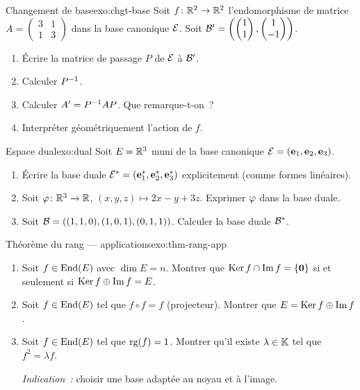 \begin{exercise}{\intermediate{} Changement de base}{exo:chgt-base}
  Soit $f\colon{\mathbb{R}}^2\to{\mathbb{R}}^2$ l'endomorphisme de matrice
  $A=\begin{pmatrix}3&1\\1&3\end{pmatrix}$ dans la base canonique ${\mathcal{E}}$.
  Soit ${\mathcal{B}}'=\left(\begin{pmatrix}1\\1\end{pmatrix},
  \begin{pmatrix}1\\-1\end{pmatrix}\right)$.
  \begin{enumerate}[label=(\alph*)]
    \item Écrire la matrice de passage $P$ de ${\mathcal{E}}$ à ${\mathcal{B}}'$.
    \item Calculer ${P}^{-1}$.
    \item Calculer $A'={P}^{-1}AP$. Que remarque-t-on~?
    \item Interpréter géométriquement l'action de $f$.
  \end{enumerate}
\end{exercise}

\begin{exercise}{\intermediate{} Espace dual}{exo:dual}
  Soit $E={\mathbb{R}}^3$ muni de la base canonique ${\mathcal{E}}=(\mathbf{e}_{1},\mathbf{e}_{2},\mathbf{e}_{3})$.
  \begin{enumerate}[label=(\alph*)]
    \item Écrire la base duale ${\mathcal{E}}^*=(\mathbf{e}_{1}^*,\mathbf{e}_{2}^*,\mathbf{e}_{3}^*)$
      explicitement (comme formes linéaires).
    \item Soit $\varphi\colon{\mathbb{R}}^3\to{\mathbb{R}}$, $(x,y,z)\mapsto 2x-y+3z$.
      Exprimer $\varphi$ dans la base duale.
    \item Soit ${\mathcal{B}}=((1,1,0),(1,0,1),(0,1,1))$. Calculer la base duale
      ${\mathcal{B}}^*$.
  \end{enumerate}
\end{exercise}

\begin{exercise}{\challenging{} Théorème du rang --- applications}{exo:thm-rang-app}
  \begin{enumerate}[label=(\alph*)]
    \item Soit $f\in\operatorname{End}(E)$ avec $\dim E=n$. Montrer que
      $\operatorname{Ker} f\cap\operatorname{Im} f=\left\{\mathbf{0}\right\}$ si et seulement si
      $\operatorname{Ker} f\oplus\operatorname{Im} f=E$.
    \item Soit $f\in\operatorname{End}(E)$ tel que $f\circ f=f$ (projecteur). Montrer
      que $E=\operatorname{Ker} f\oplus\operatorname{Im} f$.
    \item Soit $f\in\operatorname{End}(E)$ tel que $\operatorname{rg}(f)=1$. Montrer qu'il existe
      $\lambda\in{\mathbb{K}}$ tel que $f^2=\lambda f$.

      \emph{Indication~:} choisir une base adaptée au noyau et à l'image.
  \end{enumerate}
\end{exercise}

